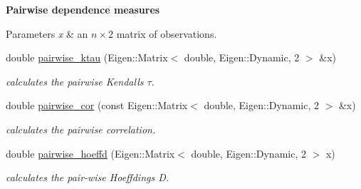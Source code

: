 \begin{Indent}{\bf Pairwise dependence measures}\par
{\em 
\begin{DoxyParams}{Parameters}
{\em x} & an $ n \times 2 $ matrix of observations. \\
\hline
\end{DoxyParams}
}\begin{DoxyCompactItemize}
\item 
double \hyperlink{namespacetools__stats_aba1c21a7a90e6fefb3d92876469f401e}{pairwise\+\_\+ktau} (Eigen\+::\+Matrix$<$ double, Eigen\+::\+Dynamic, 2 $>$ \&x)\hypertarget{namespacetools__stats_aba1c21a7a90e6fefb3d92876469f401e}{}\label{namespacetools__stats_aba1c21a7a90e6fefb3d92876469f401e}

\begin{DoxyCompactList}\small\item\em calculates the pairwise Kendall\textquotesingle{}s $ \tau $. \end{DoxyCompactList}\item 
double \hyperlink{namespacetools__stats_ada062011e2c2a18d7258a39ad0722b7e}{pairwise\+\_\+cor} (const Eigen\+::\+Matrix$<$ double, Eigen\+::\+Dynamic, 2 $>$ \&x)\hypertarget{namespacetools__stats_ada062011e2c2a18d7258a39ad0722b7e}{}\label{namespacetools__stats_ada062011e2c2a18d7258a39ad0722b7e}

\begin{DoxyCompactList}\small\item\em calculates the pairwise correlation. \end{DoxyCompactList}\item 
double \hyperlink{namespacetools__stats_a937dc78ae41420f0726847d94016ba86}{pairwise\+\_\+hoeffd} (Eigen\+::\+Matrix$<$ double, Eigen\+::\+Dynamic, 2 $>$ x)\hypertarget{namespacetools__stats_a937dc78ae41420f0726847d94016ba86}{}\label{namespacetools__stats_a937dc78ae41420f0726847d94016ba86}

\begin{DoxyCompactList}\small\item\em calculates the pair-\/wise Hoeffding\textquotesingle{}s D. \end{DoxyCompactList}\end{DoxyCompactItemize}
\end{Indent}
